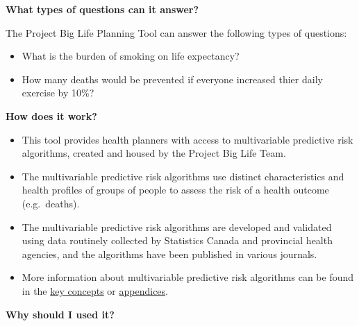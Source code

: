 \documentclass[]{book}
\providecommand{\tightlist}{%
  \setlength{\itemsep}{0pt}\setlength{\parskip}{0pt}}
\begin{document}
\textbf{What types of questions can it answer?}

The Project Big Life Planning Tool can answer the following types of questions:

\begin{itemize}
\tightlist
\item
  What is the burden of smoking on life expectancy?
\item
  How many deaths would be prevented if everyone increased thier daily exercise by 10\%?
\end{itemize}

\textbf{How does it work?}

\begin{itemize}
\item
  This tool provides health planners with access to multivariable predictive risk algorithms, created and housed by the Project Big Life Team.
\item
  The multivariable predictive risk algorithms use distinct characteristics and health profiles of groups of people to assess the risk of a health outcome (e.g.~deaths).
\item
  The multivariable predictive risk algorithms are developed and validated using data routinely collected by Statistics Canada and provincial health agencies, and the algorithms have been published in various journals.
\item
  More information about multivariable predictive risk algorithms can be found in the \protect\hyperlink{keyconcepts}{key concepts} or \protect\hyperlink{mport}{appendices}.
\end{itemize}

\textbf{Why should I used it?}
\end{document}

